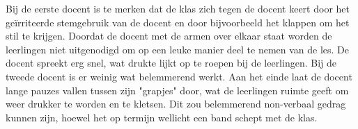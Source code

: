 \documentclass{article}
\begin{document}
\begin{enumerate}[label=(\alph*)]
            Bij de eerste docent is te merken dat de klas zich tegen de docent keert door het geïrriteerde stemgebruik van de docent en door bijvoorbeeld het klappen om het stil te krijgen. Doordat de docent met de armen over elkaar staat worden de leerlingen niet uitgenodigd om op een leuke manier deel te nemen van de les. De docent spreekt erg snel, wat drukte lijkt op te roepen bij de leerlingen.
            Bij de tweede docent is er weinig wat belemmerend werkt. Aan het einde laat de docent lange pauzes vallen tussen zijn "grapjes" door, wat de leerlingen ruimte geeft om weer drukker te worden en te kletsen. Dit zou belemmerend non-verbaal gedrag kunnen zijn, hoewel het op termijn wellicht een band schept met de klas. 
        \end{enumerate}
    \newpage
    
\end{document}
